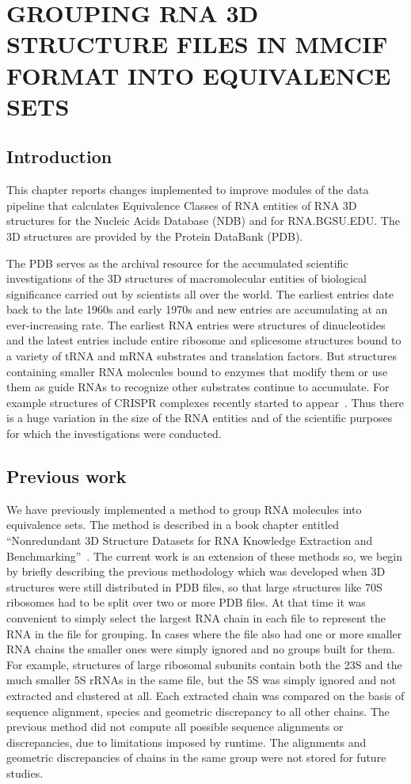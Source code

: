 \chapter{GROUPING RNA 3D STRUCTURE FILES IN MMCIF FORMAT INTO EQUIVALENCE SETS}

\section{Introduction}

This chapter reports changes implemented to improve modules of the data pipeline
that calculates Equivalence Classes of RNA entities of RNA 3D structures for the
Nucleic Acids Database (NDB) and for RNA\@.BGSU.EDU\@. The 3D structures are
provided by the Protein DataBank (PDB).

The PDB serves as the archival resource for the accumulated scientific
investigations of the 3D structures of macromolecular entities of biological
significance carried out by scientists all over the world. The earliest entries
date back to the late 1960s and early 1970s and new entries are accumulating at
an ever-increasing rate. The earliest RNA entries were structures of
dinucleotides and the latest entries include entire ribosome and splicesome
structures bound to a variety of tRNA and mRNA substrates and translation
factors. But structures containing smaller RNA molecules bound to enzymes that
modify them or use them as guide RNAs  to recognize other substrates continue to
accumulate. For example structures of CRISPR complexes recently started to
appear~\cite{Wang2015, Nunez2015}. Thus there is a huge variation in the size of
the RNA entities and of the scientific purposes for which the investigations
were conducted.

\section{Previous work}

We have previously implemented a method to group RNA molecules into equivalence
sets. The method is described in a book chapter entitled ``Nonredundant 3D
Structure Datasets for RNA Knowledge Extraction and
Benchmarking''~\cite{Leontis2012b}. The current work is an extension of these
methods so, we begin by briefly describing the previous methodology which was
developed when 3D structures were still distributed in PDB files, so that large
structures like 70S ribosomes had to be split over two or more PDB files. At
that time it was convenient to simply select the largest RNA chain in each file
to represent the RNA in the file for grouping. In cases where the file also had
one or more smaller RNA chains the smaller ones were simply ignored and no
groups built for them. For example, structures of large ribosomal subunits
contain both the 23S and the much smaller 5S rRNAs in the same file, but the 5S
was simply ignored and not extracted and clustered at all. Each extracted chain
was compared on the basis of sequence alignment, species and geometric
discrepancy to all other chains. The previous method did not compute all
possible sequence alignments or discrepancies, due to limitations imposed by
runtime. The alignments and geometric discrepancies of chains in the same group
were not stored for future studies.

